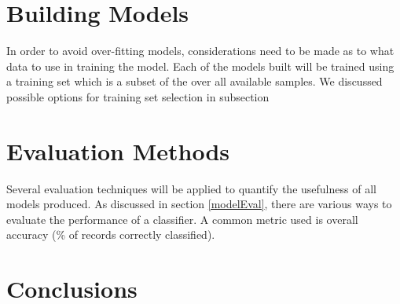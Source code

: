 \section{Building Models}
In order to avoid over-fitting models, considerations need to be made as to what data to use in training the model. Each of the models built will be trained using a training set which is a subset of the over all available samples. We discussed possible options for training set selection in subsection


\section{Evaluation Methods}
Several evaluation techniques will be applied to quantify the usefulness of all models produced. As discussed in section \ref{modelEval}, there are various ways to evaluate the performance of a classifier. A common metric used is overall accuracy (\% of records correctly classified). 


\section{Conclusions}\label{desConc}
\begin{comment}
This chapter has discussed the processes required to carry out data mining techniques on non-relational web log data. The required data transformations have been discussed as well as the implemented methods for feature generation.
\end{comment}
